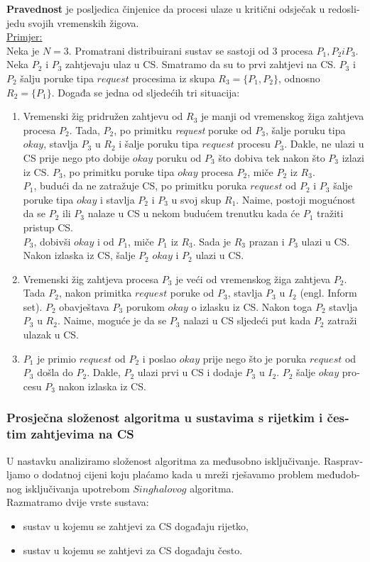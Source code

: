 \documentclass[12pt]{rectors}
\begin{document}
\begin{otherlanguage}{croatian}
\textbf{Pravednost} je posljedica činjenice da procesi ulaze u kritični odsječak u redoslijedu
svojih vremenskih žigova.
\vspace{0.5cm}
\\ \underline{Primjer:}\\
Neka je $N=3$. Promatrani distribuirani sustav se sastoji od 3 procesa $P_1,P_2 i P_3$. Neka $P_2$ i $P_3$ zahtjevaju ulaz u CS. Smatramo da su to prvi zahtjevi na CS. $P_3$ i $P_2$ šalju poruke tipa $request$ procesima iz skupa $R_3 = \{P_1,P_2\}$,
odnosno $R_2 = \{P_1\}$. Događa se jedna od sljedećih tri situacija:
\begin{enumerate}
	\item Vremenski žig pridružen zahtjevu od $R_3$ je manji od vremenskog žiga zahtjeva procesa $P_2$. Tada, $P_2$, po primitku \textit{request} poruke od $P_3$, šalje poruku tipa $okay$, stavlja $P_3$ u $R_2$ i šalje poruku tipa $request$ procesu $P_3$.
	Dakle, ne ulazi u CS prije nego pto dobije $okay$ poruku od $P_3$ što dobiva tek nakon što $P_3$ izlazi iz CS.
	$P_3$, po primitku poruke tipa $okay$ procesa $P_2$, miče $P_2$ iz $R_3$.\\
	$P_1$, budući da ne zatražuje CS, po primitku poruka $request$ od $P_2$ i $P_3$ šalje poruke tipa $okay$ i stavlja $P_2$ i $P_3$ u svoj skup $R_1$. Naime, postoji mogućnost da se $P_2$ ili $P_3$ nalaze u CS u nekom budućem trenutku kada će $P_1$ tražiti pristup CS.\\
	$P_3$, dobivši $okay$ i od $P_1$, miče $P_1$ iz $R_3$. Sada je $R_3$ prazan i $P_3$ ulazi u CS. Nakon izlaska iz CS, šalje $P_2$ $okay$ i $P_2$ ulazi u CS.
	
	\item Vremenski žig zahtjeva procesa $P_3$ je veći od vremenskog žiga zahtjeva $P_2$.
	Tada $P_2$, nakon primitka $request$ poruke od $P_3$, stavlja $P_3$ u $I_2$ (engl. Inform set). $P_2$ obavještava $P_3$ porukom $okay$ o izlasku iz CS. Nakon toga $P_2$ stavlja $P_3$ u $R_2$. Naime, moguće je da se $P_3$ nalazi u CS sljedeći put kada $P_2$ zatraži ulazak u CS.
	\item $P_1$ je primio $request$ od $P_2$ i poslao $okay$ prije nego što je poruka  $request$ od $P_3$ došla do $P_2$. Dakle, $P_2$ ulazi prvi u CS i dodaje $P_3$ u $I_2$.
	$P_2$ šalje $okay$ procesu $P_3$ nakon izlaska iz CS.
\end{enumerate}
\subsubsection{Prosječna složenost algoritma u sustavima s rijetkim i čestim zahtjevima na CS}
U nastavku analiziramo složenost algoritma za međusobno isključivanje.
Raspravljamo o dodatnoj cijeni koju plaćamo 
kada u mreži rješavamo problem međudobnog isključivanja upotrebom $Singhalovog$ algoritma.\\
Razmatramo dvije vrste sustava:%
\begin{itemize}
	\item sustav u kojemu se zahtjevi za CS događaju rijetko,
	\item sustav u kojemu se zahtjevi za CS događaju često.
\end{itemize}


\end{otherlanguage}
\end{document}
